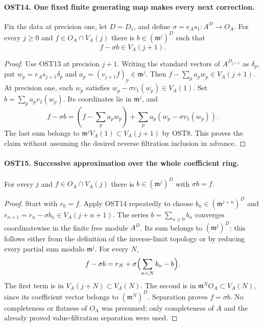 \paragraph{OST14. One fixed finite generating map makes every next correction.}
\label{claim:OST14}
Fix the data at precision one, let $D=D_1$, and define
$\sigma=e_As_1:A^D\to O_A$.
For every $j\geq0$ and $f\in O_A\cap V_A(j)$ there is
$b\in(\mathfrak m^j)^D$ such that
\begin{equation}\label{eq:ost-one-step}
                         f-\sigma b\in V_A(j+1).
\end{equation}
\begin{proof}
Use OST13 at precision $j+1$.  Writing the standard vectors
of $A^{D_{j+1}}$ as $\delta_p$, put
$w_p=e_As_{j+1}\delta_p$ and
$a_p=(v_{j+1}f)_p\in\mathfrak m^j$.
Then $f-\sum_pa_pw_p\in V_A(j+1)$.
At precision one, each $w_p$ satisfies
$w_p-\sigma v_1(w_p)\in V_A(1)$.
Set $b=\sum_pa_pv_1(w_p)$.  Its coordinates lie in
$\mathfrak m^j$, and
\[
 f-\sigma b=
 (f-\sum_pa_pw_p)+\sum_pa_p(w_p-\sigma v_1(w_p)).
\]
The last sum belongs to $\mathfrak m^jV_A(1)\subset V_A(j+1)$
by OST8.  This proves the claim without assuming the desired
reverse filtration inclusion in advance.
\end{proof}

\paragraph{OST15. Successive approximation over the whole coefficient ring.}
\label{claim:OST15}
For every $j$ and $f\in O_A\cap V_A(j)$ there is
$b\in(\mathfrak m^j)^D$ with $\sigma b=f$.
\begin{proof}
Start with $r_0=f$.  Apply OST14 repeatedly to choose
$b_n\in(\mathfrak m^{j+n})^D$ and
$r_{n+1}=r_n-\sigma b_n\in V_A(j+n+1)$.
The series $b=\sum_{n\geq0}b_n$ converges coordinatewise
in the finite free module $A^D$.  Its sum belongs to
$(\mathfrak m^j)^D$: this follows either from the definition
of the inverse-limit topology or by reducing every partial
sum modulo $\mathfrak m^j$.  For every $N$,
\[
 f-\sigma b=r_N+
          \sigma\Bigl(\sum_{n<N}b_n-b\Bigr).
\]
The first term is in $V_A(j+N)\subset V_A(N)$.
The second is in $\mathfrak m^NO_A\subset V_A(N)$,
since its coefficient vector belongs to $(\mathfrak m^N)^D$.
Separation proves $f=\sigma b$.  No completeness or flatness
of $O_A$ was presumed; only completeness of $A$ and the
already proved value-filtration separation were used.
\end{proof}

